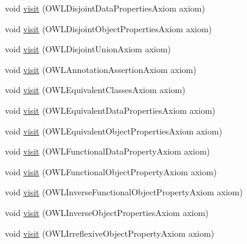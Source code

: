 \begin{DoxyCompactItemize}
\item 
void \hyperlink{classorg_1_1coode_1_1owlapi_1_1functionalrenderer_1_1_o_w_l_object_renderer_acb267555ab5885a5aeae40111121da4d}{visit} (O\-W\-L\-Disjoint\-Data\-Properties\-Axiom axiom)
\item 
void \hyperlink{classorg_1_1coode_1_1owlapi_1_1functionalrenderer_1_1_o_w_l_object_renderer_ac438dd8d52962377e2e7a97f66cf9816}{visit} (O\-W\-L\-Disjoint\-Object\-Properties\-Axiom axiom)
\item 
void \hyperlink{classorg_1_1coode_1_1owlapi_1_1functionalrenderer_1_1_o_w_l_object_renderer_a8c01cc0b42b0ae06c20f386f53c8e2df}{visit} (O\-W\-L\-Disjoint\-Union\-Axiom axiom)
\item 
void \hyperlink{classorg_1_1coode_1_1owlapi_1_1functionalrenderer_1_1_o_w_l_object_renderer_a3404e1826c6b5d9fbfe3a4cf3eec56f1}{visit} (O\-W\-L\-Annotation\-Assertion\-Axiom axiom)
\item 
void \hyperlink{classorg_1_1coode_1_1owlapi_1_1functionalrenderer_1_1_o_w_l_object_renderer_adafff14a5f0ed035a9512c688655e016}{visit} (O\-W\-L\-Equivalent\-Classes\-Axiom axiom)
\item 
void \hyperlink{classorg_1_1coode_1_1owlapi_1_1functionalrenderer_1_1_o_w_l_object_renderer_a90549b7d8f8b4f0b34f355b52ea6d22c}{visit} (O\-W\-L\-Equivalent\-Data\-Properties\-Axiom axiom)
\item 
void \hyperlink{classorg_1_1coode_1_1owlapi_1_1functionalrenderer_1_1_o_w_l_object_renderer_ae14ce93f2c393ffcf88cfdd6bd763628}{visit} (O\-W\-L\-Equivalent\-Object\-Properties\-Axiom axiom)
\item 
void \hyperlink{classorg_1_1coode_1_1owlapi_1_1functionalrenderer_1_1_o_w_l_object_renderer_aa662853fb54afaa8b3d4f2bc7de5c503}{visit} (O\-W\-L\-Functional\-Data\-Property\-Axiom axiom)
\item 
void \hyperlink{classorg_1_1coode_1_1owlapi_1_1functionalrenderer_1_1_o_w_l_object_renderer_a82eccc7c80e14b3c687c7dd516e376c9}{visit} (O\-W\-L\-Functional\-Object\-Property\-Axiom axiom)
\item 
void \hyperlink{classorg_1_1coode_1_1owlapi_1_1functionalrenderer_1_1_o_w_l_object_renderer_a125270e6b129d760e81e64f197dcd844}{visit} (O\-W\-L\-Inverse\-Functional\-Object\-Property\-Axiom axiom)
\item 
void \hyperlink{classorg_1_1coode_1_1owlapi_1_1functionalrenderer_1_1_o_w_l_object_renderer_ae8288ed9da8a069076e273dc87b0afc1}{visit} (O\-W\-L\-Inverse\-Object\-Properties\-Axiom axiom)
\item 
void \hyperlink{classorg_1_1coode_1_1owlapi_1_1functionalrenderer_1_1_o_w_l_object_renderer_ab27ed3da1d296e06a4036947deed391c}{visit} (O\-W\-L\-Irreflexive\-Object\-Property\-Axiom axiom)

\end{DoxyCompactItemize}
